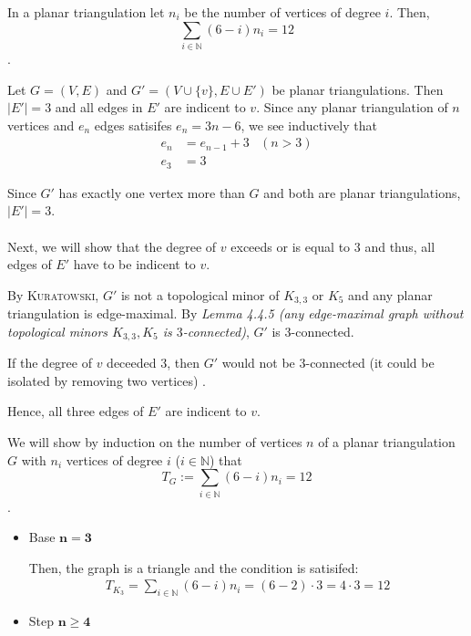 \documentclass[a4paper]{article}
\begin{document}
	\begin{solution}{17}
		\begin{theorem}{In a planar triangulation let $n_i$ be the number of vertices of degree $i$. Then, \begin{equation*}\sum_{i \in \mathbb{N}} (6 - i)n_i = 12 \end{equation*}.}
			\begin{lemma}{Let $G = (V, E)$ and $G' = (V \cup \{v\}, E \cup E')$ be planar triangulations. Then $|E'| = 3$ and all edges in $E'$ are indicent to $v$.}
			Since any planar triangulation of $n$ vertices and $e_n$ edges satisifes $e_n = 3n - 6$, we see inductively that
			\begin{align*}
				e_n &= e_{n-1} + 3& (n > 3)\\
				e_3 &= 3
			\end{align*}
			
			Since $G'$ has exactly one vertex more than $G$ and both are planar triangulations, $|E'| = 3$.\\
			\ \\
			Next, we will show that the degree of $v$ exceeds or is equal to $3$ and thus, all edges of $E'$ have to be indicent to $v$.

			By \textsc{Kuratowski}, $G'$ is not a topological minor of $K_{3,3}$ or $K_5$ and any planar triangulation is edge-maximal. By \emph{Lemma 4.4.5 (any edge-maximal graph without topological minors $K_{3,3}, K_5$ is $3$-connected)}, $G'$ is $3$-connected.

			If the degree of $v$ deceeded $3$, then $G'$ would not be $3$-connected (it could be isolated by removing two vertices) .
			
			Hence, all three edges of $E'$ are indicent to $v$.
			\end{lemma}
			
			We will show by induction on the number of vertices $n$ of a planar triangulation $G$ with $n_i$ vertices of degree $i$ ($i \in \mathbb{N}$) that 
			\begin{equation*}
				T_G := \sum_{i \in \mathbb{N}} (6 - i)n_i = 12
			\end{equation*}
	.
	
			\begin{itemize}
				\item Base $\mathbf{n = 3}$
					
					Then, the graph is a triangle and the condition is satisifed:
					\begin{align*}
						T_{K_3} = \sum_{i \in \mathbb{N}} (6 - i)n_i = (6-2) \cdot 3 = 4 \cdot 3 = 12
					\end{align*}
				\item Step $\mathbf{n \geq 4}$
					

\end{itemize}
\end{theorem}
\end{solution}
\end{document}
